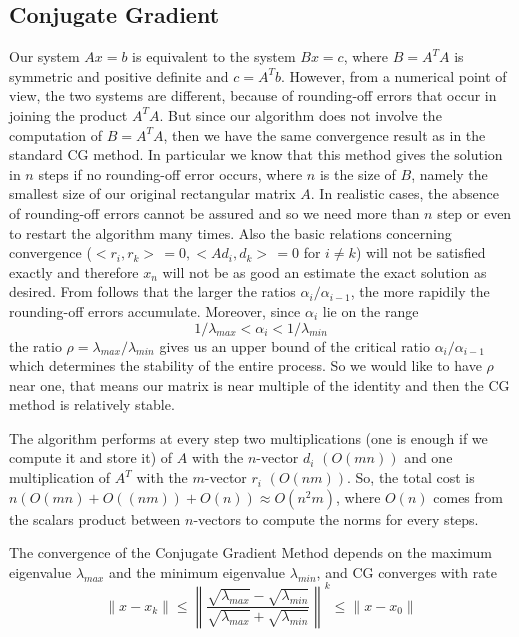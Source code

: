 \documentclass{article}
\begin{document}
\subsection{Conjugate Gradient}\label{subsec:conjugate-gradient}
Our system $Ax = b$ is equivalent to the system $Bx = c$, where $B = A^{T}A$ is symmetric and positive definite and $c = A^{T}b$. However, from a numerical point of view, the two systems are different, because of rounding-off errors that occur in joining the product $A^{T}A$. But since our algorithm does not involve the computation of $B = A^{T}A$, then we have the same convergence result as in the standard CG method. In particular we know that this method gives the solution in $n$ steps if no rounding-off error occurs, where $n$ is the size of $B$, namely the smallest size of our original rectangular matrix $A$. In realistic cases, the absence of rounding-off errors cannot be assured and so we need more than $n$ step or even to restart the algorithm many times. Also the basic relations concerning convergence ($<r_i,r_k>\,= 0, <Ad_i,d_k>\,= 0$ for $i \ne k$) will not be satisfied exactly and therefore $x_n$ will not be as good an estimate the exact solution as desired. From \cite{hestenes1952methods} follows that the larger the ratios $\alpha_i / \alpha_{i-1}$, the more rapidily the rounding-off errors accumulate. Moreover, since $\alpha_i$ lie on the range
\[
1 / \lambda_{max} < \alpha_i < 1 / \lambda_{min}
\] 
the ratio $\rho = \lambda_{max}/\lambda_{min}$ gives us an upper bound of the critical ratio  $\alpha_i / \alpha_{i-1}$ which determines the stability of the entire process. So we would like to have $\rho$ near one, that means our matrix is near multiple of the identity and then the CG method is relatively stable. 

The algorithm performs at every step two multiplications  (one is enough if we compute it and store it) of $A$ with the $n$-vector $d_i$ $(O(mn))$ and one multiplication of $A^{T}$ with the $m$-vector $r_i$ $(O(nm))$. 
So, the total cost is $n(O(mn) + O((nm)) + O(n)) \approx O(n^2m)$, where $O(n)$ comes from the scalars product between $n$-vectors to compute the norms for every steps.

The convergence of the Conjugate Gradient Method depends on the maximum eigenvalue $\lambda_{max}$ and the minimum eigenvalue $\lambda_{min}$, and CG converges with rate 
\begin{equation}\label{eq:cgconv}
\|x-x_{k}\| \leq \left\lVert\frac{\sqrt{\lambda_{max}}-\sqrt{\lambda_{min}}}{\sqrt{\lambda_{max}}+\sqrt{\lambda_{min}}}\right\rVert^{k} \leq \|x - x_{0}\| 
\end{equation}
\end{document}
